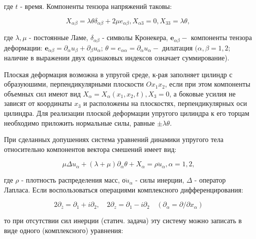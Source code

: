 \documentclass[10pt]{article}
\begin{document}
где $t$ - время. Компоненты тензора напряжений таковы:



\[

X_{\alpha \beta}=\lambda \theta \delta_{\alpha \beta}+2 \mu e_{\alpha \beta}, X_{\alpha 3}=0, X_{33}=\lambda \theta \text {, }

\]



где $\lambda, \mu$ - постоянные Ламе, $\delta_{\alpha \beta}$ - символы Кронекера, $\boldsymbol{e}_{\alpha \beta}-$ компоненты тензора деформации: $\boldsymbol{e}_{\alpha \beta}=\partial_{\alpha} u_{\beta}+\partial_{\beta} u_{\alpha}$; $\theta=e_{\alpha \alpha}=\partial_{\alpha} u_{\alpha}-$ дилатация $(\alpha, \beta=1,2$; наличие в выражении двух одинаковых индексов означает суммирование).



Плоская деформация возможна в упругой среде, к-рая заполняет цилиндр с образуюшими, перпендикулярными плоскости $O x_{1} x_{2}$, если при этом компоненты объемных сил имеют вид $X_{\alpha}=X_{\alpha}\left(x_{1}, x_{2}, t\right), X_{3}=0$, а боковые усилия не зависят от координаты $x_{3}$ и расположены на плоскостях, перпендикулярных оси цилиндра. Для реализации плоской деформации упругого цилиндра к его торцам необходимо приложить нормальные силы, равные $\pm \lambda \theta$.



При сделанных допушениях система уравнений динамики упругого тела относительно компонентов вектора смешений имеет вид:



\[

\mu \Delta u_{\alpha}+(\lambda+\mu) \partial_{\alpha} \theta+X_{\alpha}=\rho \ddot{u}_{\alpha}, \alpha=1,2,

\]



где $\rho$ - плотность распределения масс, $о \ddot{u}_{\alpha}$ - силы инерции, $\Delta$ - оператор Лапласа. Если воспользоваться операциями комплексного дифференцирования:



\[

2 \partial_{\bar{z}}=\partial_{1}+i \partial_{2}, \quad 2 \partial_{z}=\partial_{1}-i \partial_{2} \quad\left(\partial_{\alpha}=\partial / \partial x_{\alpha}\right)

\]



то при отсутствии сил инерции (статич. задача) эту систему можно записать в виде одного (комплексного) уравнения:
\end{document}
